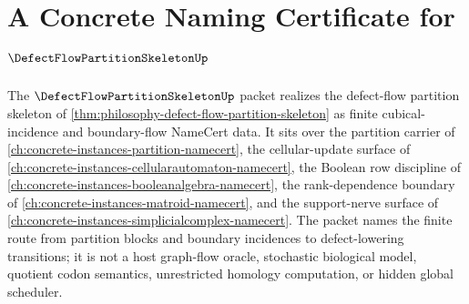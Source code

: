 \chapter{A Concrete Naming Certificate for $\DefectFlowPartitionSkeletonUp$}
\label{ch:concrete-instances-defect-flow-partition-skeleton-namecert}

The $\DefectFlowPartitionSkeletonUp$ packet realizes the defect-flow partition skeleton of \autoref{thm:philosophy-defect-flow-partition-skeleton} as finite cubical-incidence and boundary-flow NameCert data. It sits over the partition carrier of \autoref{ch:concrete-instances-partition-namecert}, the cellular-update surface of \autoref{ch:concrete-instances-cellularautomaton-namecert}, the Boolean row discipline of \autoref{ch:concrete-instances-booleanalgebra-namecert}, the rank-dependence boundary of \autoref{ch:concrete-instances-matroid-namecert}, and the support-nerve surface of \autoref{ch:concrete-instances-simplicialcomplex-namecert}. The packet names the finite route from partition blocks and boundary incidences to defect-lowering transitions; it is not a host graph-flow oracle, stochastic biological model, quotient codon semantics, unrestricted homology computation, or hidden global scheduler.

